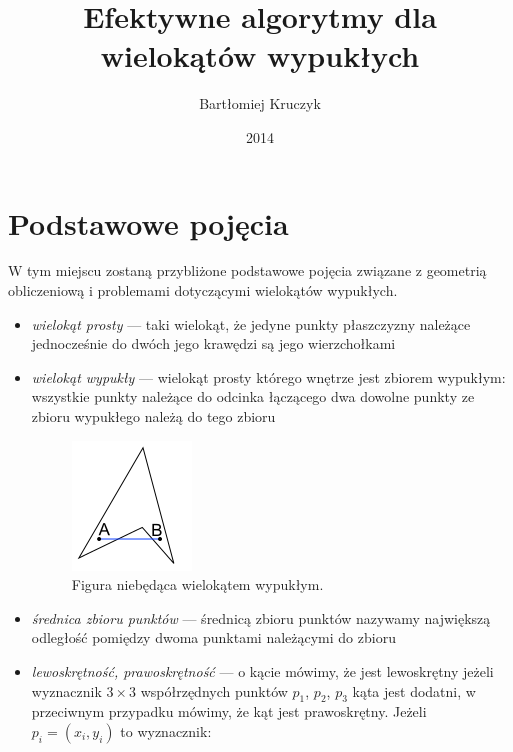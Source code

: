 \documentclass[12pt,oneside,brudnopis]{xelatex-mgr/xmgr}
\author   {Bartłomiej Kruczyk}
\title    {Efektywne algorytmy dla wielokątów wypukłych}
\date     {2014}
\begin{document}




\chapter{Podstawowe pojęcia}
W tym miejscu zostaną przybliżone podstawowe pojęcia związane z
geometrią obliczeniową i problemami dotyczącymi wielokątów wypukłych.

\begin{itemize}
\item{\emph{wielokąt prosty}} --- taki wielokąt, że jedyne punkty
  płaszczyzny należące jednocześnie do dwóch jego krawędzi są jego
  wierzchołkami
\item{\emph{wielokąt wypukły}} --- wielokąt prosty którego wnętrze
  jest zbiorem wypukłym: wszystkie punkty należące do odcinka
  łączącego dwa dowolne punkty ze zbioru wypukłego należą do tego
  zbioru

  \begin{figure}[htp]
    \centering
    \includegraphics{img/nonconvex}
    \caption{Figura niebędąca wielokątem wypukłym.}
  \end{figure}

\item{\emph{średnica zbioru punktów}} --- średnicą zbioru punktów
  nazywamy największą odległość pomiędzy dwoma punktami należącymi do
  zbioru

\item{\emph{lewoskrętność, prawoskrętność}} --- o kącie mówimy, że
  jest lewoskrętny jeżeli wyznacznik $3 \times 3$ współrzędnych punktów
  $p_1$, $p_2$, $p_3$ kąta jest dodatni, w przeciwnym przypadku
  mówimy, że kąt jest prawoskrętny. Jeżeli $p_i = (x_i, y_i)$ to
  wyznacznik:


\end{itemize}
\end{document}
